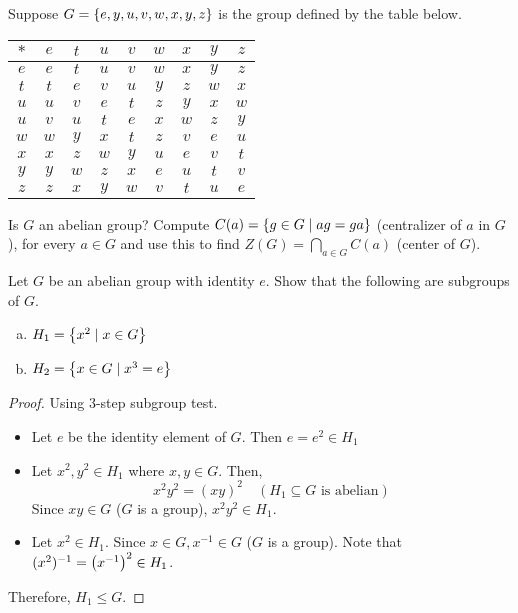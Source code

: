 \begin{exercise}
    Suppose $G = \qty{e, y, u, v, w, x, y, z}$ is the group defined by the table below.
    
    \hspace{1em}
    
    \begin{center}
        \begin{tabular}{c | c c c c c c c c}
             $\ast$ & $e$ & $t$ & $u$ & $v$ & $w$ & $x$ & $y$ & $z$ \\ 
             \hline
             $e$ & $e$ & $t$ & $u$ & $v$ & $w$ & $x$ & $y$ & $z$ \\
             $t$ & $t$ & $e$ & $v$ & $u$ & $y$ & $z$ & $w$ & $x$ \\
             $u$ & $u$ & $v$ & $e$ & $t$ & $z$ & $y$ & $x$ & $w$ \\
             $u$ & $v$ & $u$ & $t$ & $e$ & $x$ & $w$ & $z$ & $y$ \\
             $w$ & $w$ & $y$ & $x$ & $t$ & $z$ & $v$ & $e$ & $u$ \\
             $x$ & $x$ & $z$ & $w$ & $y$ & $u$ & $e$ & $v$ & $t$ \\
             $y$ & $y$ & $w$ & $z$ & $x$ & $e$ & $u$ & $t$ & $v$ \\
             $z$ & $z$ & $x$ & $y$ & $w$ & $v$ & $t$ & $u$ & $e$
        \end{tabular}
    \end{center}
    \hspace{1em}
    
    Is $G$ an abelian group? Compute $C(a) = \qty{g \in G \mid ag = ga}$ (centralizer of $a$ in $G$), for every $a \in G$ and use this to find $Z(G) = \bigcap_{a \in G} C(a)$ (center of $G$).
\end{exercise}

\begin{exercise}
    Let $G$ be an abelian group with identity $e$. Show that the following are subgroups of $G$.
    \begin{enumerate}[(a)]
        \item $H_1 = \qty{x^2 \mid x \in G}$
        \item $H_2 = \qty{x \in G \mid x^3 = e}$
    \end{enumerate}
\end{exercise}

\begin{proof}
    Using 3-step subgroup test.
    \begin{itemize}
        \item Let $e$ be the identity element of $G$. Then $e = e^2 \in H_1$ 
        \item Let $x^2, y^2 \in H_1$ where $x, y \in G$. Then,
        \[ x^2y^2 = (xy)^2 \hspace{1em} (H_1 \subseteq G \text{ is abelian}) \]
        Since $xy \in G$ ($G$ is a group), $x^2y^2 \in H_1$.
        \item Let $x^2 \in H_1$. Since $x \in G, x^{-1} \in G$ ($G$ is a group). Note that  $(x^2)^{-1} = \qty(x^{-1})^2 \in H_1 $. 
    \end{itemize}
    Therefore, $H_1 \leq G$. \qedsymbol
\end{proof}


